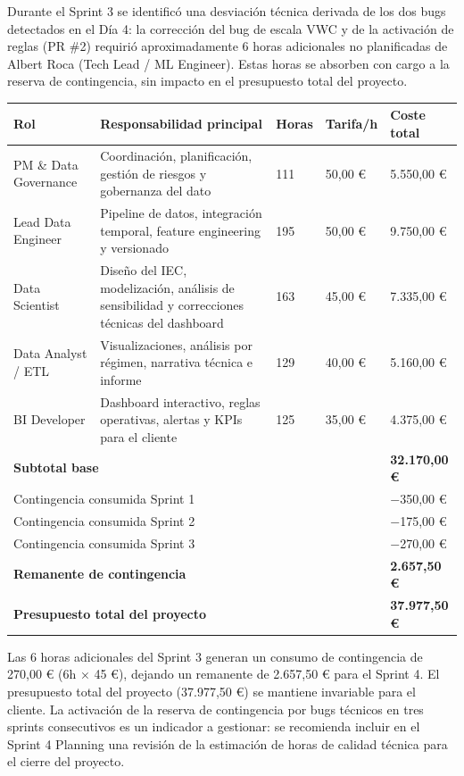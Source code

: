\documentclass[11pt,a4paper]{article}
\begin{document}
Durante el Sprint 3 se identificó una desviación técnica derivada de los dos bugs detectados
en el Día 4: la corrección del bug de escala VWC y de la activación de reglas (PR \#2)
requirió aproximadamente 6 horas adicionales no planificadas de Albert Roca (Tech Lead /
ML Engineer). Estas horas se absorben con cargo a la reserva de contingencia, sin impacto
en el presupuesto total del proyecto.

\begin{longtable}{p{} p{} p{} p{} p{}}
\textbf{Rol} & \textbf{Responsabilidad principal} & \textbf{Horas} & \textbf{Tarifa/h} & \textbf{Coste total} \\
\hline
PM \& Data Governance    & Coordinación, planificación, gestión de riesgos y gobernanza del dato & 111 & 50{,}00 € & 5.550,00 € \\
Lead Data Engineer       & Pipeline de datos, integración temporal, feature engineering y versionado & 195 & 50{,}00 € & 9.750,00 € \\
Data Scientist           & Diseño del IEC, modelización, análisis de sensibilidad y correcciones técnicas del dashboard & 163 & 45{,}00 € & 7.335,00 € \\
Data Analyst / ETL       & Visualizaciones, análisis por régimen, narrativa técnica e informe & 129 & 40{,}00 € & 5.160,00 € \\
BI Developer             & Dashboard interactivo, reglas operativas, alertas y KPIs para el cliente & 125 & 35{,}00 € & 4.375,00 € \\
\hline
\multicolumn{4}{l}{\textbf{Subtotal base}} & \textbf{32.170,00 €} \\
\multicolumn{4}{l}{Contingencia consumida Sprint 1} & $-$350,00 € \\
\multicolumn{4}{l}{Contingencia consumida Sprint 2} & $-$175,00 € \\
\multicolumn{4}{l}{Contingencia consumida Sprint 3} & $-$270,00 € \\
\multicolumn{4}{l}{\textbf{Remanente de contingencia}} & \textbf{2.657,50 €} \\
\multicolumn{4}{l}{\textbf{Presupuesto total del proyecto}} & \textbf{37.977,50 €} \\
\end{longtable}

Las 6 horas adicionales del Sprint 3 generan un consumo de contingencia de 270,00 € (6h ×
45 €), dejando un remanente de 2.657,50 € para el Sprint 4. El presupuesto total del
proyecto (37.977,50 €) se mantiene invariable para el cliente. La activación de la reserva de
contingencia por bugs técnicos en tres sprints consecutivos es un indicador a gestionar: se
recomienda incluir en el Sprint 4 Planning una revisión de la estimación de horas de calidad
técnica para el cierre del proyecto.
\end{document}
